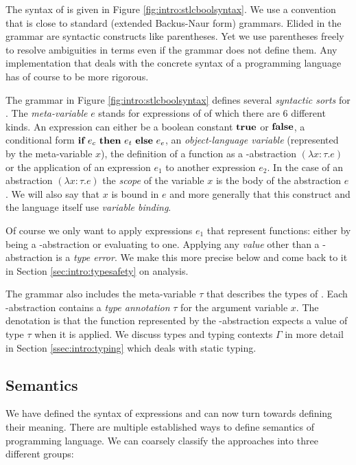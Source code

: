 {The syntax of \stlcbool is given in Figure \ref{fig:intro:stlcboolsyntax}. We
use a convention that is close to standard (extended Backus-Naur form)
grammars. Elided in the grammar are syntactic constructs like parentheses. Yet
we use parentheses freely to resolve ambiguities in terms even if the grammar
does not define them. Any implementation that deals with the concrete syntax of
a programming language has of course to be more rigorous.

The grammar in Figure \ref{fig:intro:stlcboolsyntax} defines several
\emph{syntactic sorts} for \stlcbool. The \emph{meta-variable} $e$ stands for
expressions of \stlcbool of which there are 6 different kinds. An expression can
either be a boolean constant $\textbf{true}$ or $\textbf{false}$, a conditional form
$\textbf{if}~{e_c}~\textbf{then}~{e_t}~\textbf{else}~{e_e}$, an \emph{object-language variable} (represented by the
meta-variable $x$), the definition of a function as a \textlambda-abstraction
$(\lambda x:\tau.e)$ or the application of an expression $e_1$ to another
expression $e_2$. In the case of an abstraction $(\lambda x:\tau.e)$ the
\emph{scope} of the variable $x$ is the body of the abstraction $e$. We will
also say that $x$ is bound in $e$ and more generally that this construct and the
\stlcbool language itself use \emph{variable binding}.

Of course we only want to apply expressions $e_1$ that represent functions:
either by being a \textlambda-abstraction or evaluating to one. Applying any
\emph{value} other than a \textlambda-abstraction is a \emph{type error}. We
make this more precise below and come back to it in Section
\ref{sec:intro:typesafety} on analysis.

The grammar also includes the meta-variable $\tau$ that describes the types of
\stlcbool. Each \textlambda-abstraction contains a \emph{type annotation} $\tau$
for the argument variable $x$. The denotation is that the function represented
by the \textlambda-abstraction expects a value of type $\tau$ when it is
applied. We discuss types and typing contexts $\Gamma$ in more detail in Section
\ref{ssec:intro:typing} which deals with static typing.


\subsection{Semantics}\label{ssec:intro:semantics}

We have defined the syntax of \stlcbool expressions and can now turn towards
defining their meaning. There are multiple established ways to define semantics
of programming language. We can coarsely classify the approaches into three
different groups:

}
